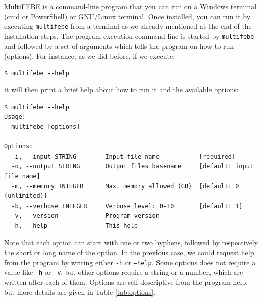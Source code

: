 \documentclass[a4paper,fleqn]{book}
\begin{document}
MultiFEBE is a command-line program that you can run on a Windows terminal (cmd or PowerShell) or GNU/Linux terminal. Once installed, you can run it by executing \texttt{multifebe} from a terminal as we already mentioned at the end of the installation steps. The program execution command line is started by \texttt{multifebe} and followed by a set of arguments which tells the program on how to run (options). For instance, as we did before, if we execute:
\begin{Verbatim}[frame=single, fontsize=\small]
$ multifebe --help
\end{Verbatim}
it will then print a brief help about how to run it and the available options:
\begin{Verbatim}[frame=single, fontsize=\small]
$ multifebe --help
Usage:                                                                          
  multifebe [options]                                                         

Options:                                                                        
  -i, --input STRING        Input file name           [required]                
  -o, --output STRING       Output files basename     [default: input file name]
  -m, --memory INTEGER      Max. memory allowed (GB)  [default: 0 (unlimited)]  
  -b, --verbose INTEGER     Verbose level: 0-10       [default: 1]              
  -v, --version             Program version                                     
  -h, --help                This help                                           
\end{Verbatim}
Note that each option can start with one or two hyphens, followed by respectively the short or long name of the option. In the previous case, we could request help from the program by writing either \texttt{-h} or \texttt{--help}. Some options does not require a value like \texttt{-h} or \texttt{-v}, but other options require a string or a number, which are written after each of them. Options are self-descriptive from the program help, but more details are given in Table \ref{tab:options}.
\end{document}
